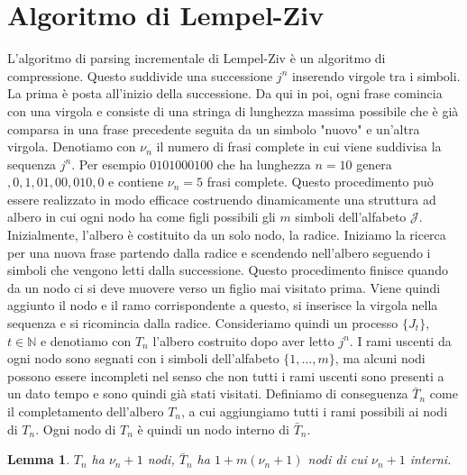 \documentclass[a4paper,11pt]{book}
\theoremstyle{plain}
\newtheorem{lemma}[teo]{Lemma}
\theoremstyle{definition}
\theoremstyle{remark}
\newcommand{\N}{\mathbb{N}}
\begin{document}
\section{Algoritmo di Lempel-Ziv}\label{LZ}
L'algoritmo di parsing incrementale di Lempel-Ziv \cite{LZ78} è un algoritmo di compressione. Questo suddivide una successione $j^n$ inserendo virgole tra i simboli. La prima è posta all'inizio della successione. Da qui in poi, ogni frase comincia con una virgola e consiste di una stringa di lunghezza massima possibile che è già comparsa in una frase precedente seguita da un simbolo "nuovo" e un'altra virgola.\newline
Denotiamo con $\nu_n$ il numero di frasi complete in cui viene suddivisa la sequenza $j^n$. Per esempio $0101000100$ che ha lunghezza $n=10$ genera $,0,1,01,00,010,0$ e contiene $\nu_n=5$ frasi complete.\newline
Questo procedimento può essere realizzato in modo efficace costruendo dinamicamente una struttura ad albero in cui ogni nodo ha come figli possibili gli $m$ simboli dell'alfabeto $\mathcal{J}$. Inizialmente, l'albero è costituito da un solo nodo, la radice. Iniziamo la ricerca per una nuova frase partendo dalla radice e scendendo nell'albero seguendo i simboli che vengono letti dalla successione. Questo procedimento finisce quando da un nodo ci si deve muovere verso un figlio mai visitato prima. Viene quindi aggiunto il nodo e il ramo corrispondente a questo, si inserisce la virgola nella sequenza e si ricomincia dalla radice.\newline
Consideriamo quindi un processo $\{J_t\}$, $t\in \N$ e denotiamo con $T_n$ l'albero costruito dopo aver letto $j^n$. I rami uscenti da ogni nodo sono segnati con i simboli dell'alfabeto $\{1,\ldots,m\}$, ma alcuni nodi possono essere incompleti nel senso che non tutti i rami uscenti sono presenti a un dato tempo e sono quindi già stati visitati. Definiamo di conseguenza $\bar{T}_n$ come il completamento dell'albero $T_n$, a cui aggiungiamo tutti i rami possibili ai nodi di $T_n$. Ogni nodo di $T_n$ è quindi un nodo interno di $\bar{T}_n$. 
\begin{lemma}
	$T_n$ ha $\nu_n+1$ nodi, $\bar{T}_n$ ha $1+m(\nu_n+1)$ nodi di cui $\nu_n+1$ interni.
\end{lemma}
\end{document}
